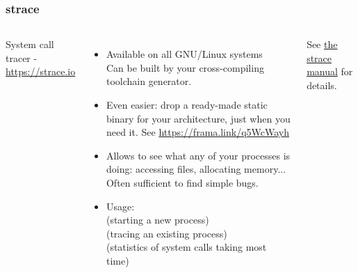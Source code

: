 \begin{frame}[fragile]
  \frametitle{strace}
  \begin{columns}
  \small
  System call tracer - \url{https://strace.io}
  \begin{itemize}
  \item Available on all GNU/Linux systems\\
        Can be built by your cross-compiling toolchain generator.
  \item Even easier: drop a ready-made static binary for your
        architecture, just when you need it. See
        \url{https://frama.link/q5WcWayh}
  \item Allows to see what any of your processes is doing: accessing files, allocating memory...
        Often sufficient to find simple bugs.
  \item Usage:\\
     (starting a new process)\\
     (tracing an existing process)\\
     (statistics of system calls taking most time)
  \end{itemize}
  See \href{https://man7.org/linux/man-pages/man1/strace.1.html}{the strace manual} for details.

\end{columns}
\end{frame}
